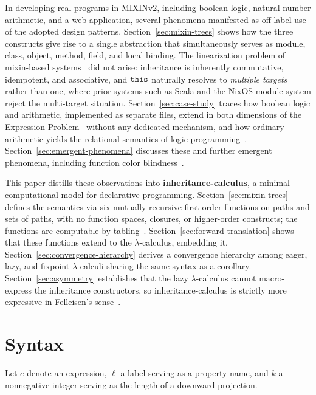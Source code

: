In developing real programs in MIXINv2, including boolean logic,
natural number arithmetic, and a web application, several
phenomena manifested as off-label use of the adopted
design patterns.
Section~\ref{sec:mixin-trees} shows how the three constructs
give rise to a single abstraction that simultaneously serves as
module, class, object, method, field, and local binding.
The linearization problem of mixin-based
systems~\cite{bracha1990-mixin-inheritance,barrett1996-c3-linearization}
did not arise: inheritance is inherently commutative, idempotent,
and associative, and $\mathtt{this}$ naturally resolves to
\emph{multiple targets} rather than one, where prior systems
such as Scala and the NixOS module system reject the multi-target
situation.
Section~\ref{sec:case-study} traces how boolean logic and
arithmetic, implemented as separate files, extend in both
dimensions of the Expression
Problem~\cite{wadler1998-expression-problem} without any dedicated
mechanism, and how ordinary arithmetic yields the relational
semantics of logic
programming~\cite{vanemden1976-predicate-logic-semantics}.
Section~\ref{sec:emergent-phenomena} discusses these and further
emergent phenomena, including function color
blindness~\cite{nystrom2015-function-color}.

This paper distills these observations into \textbf{inheritance-calculus},
a minimal computational model for declarative programming.
Section~\ref{sec:mixin-trees} defines the semantics via six
mutually recursive first-order functions on paths and sets of paths,
with no function spaces, closures, or higher-order constructs;
the functions are computable by
tabling~\cite{tamaki1986-tabled-resolution}.
Section~\ref{sec:forward-translation} shows that
these functions extend to the $\lambda$-calculus, embedding it.
Section~\ref{sec:convergence-hierarchy} derives a convergence hierarchy
among eager, lazy, and fixpoint
$\lambda$-calculi sharing the same syntax as a corollary.
Section~\ref{sec:asymmetry} establishes that the lazy
$\lambda$-calculus cannot macro-express the inheritance constructors,
so inheritance-calculus is strictly more expressive in
Felleisen's sense~\cite{felleisen1991-expressive-power}.

\section{Syntax}
\label{sec:syntax}

Let $e$ denote an expression,
$\ell$ a label serving as a property name,
and $k$ a nonnegative integer serving as the length of a downward projection.

